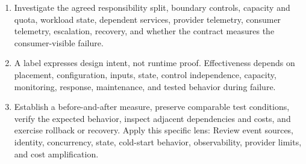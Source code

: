 \documentclass[11pt]{article}
\begin{document}
\begin{enumerate}
\item Investigate the agreed responsibility split, boundary controls, capacity and quota, workload state, dependent services, provider telemetry, consumer telemetry, escalation, recovery, and whether the contract measures the consumer-visible failure.
\item A label expresses design intent, not runtime proof. Effectiveness depends on placement, configuration, inputs, state, control independence, capacity, monitoring, response, maintenance, and tested behavior during failure.
\item Establish a before-and-after measure, preserve comparable test conditions, verify the expected behavior, inspect adjacent dependencies and costs, and exercise rollback or recovery. Apply this specific lens: Review event sources, identity, concurrency, state, cold-start behavior, observability, provider limits, and cost amplification.
\end{enumerate}
\end{document}

